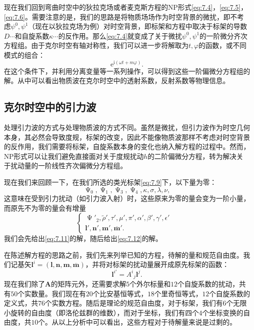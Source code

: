 现在我们回到弯曲时空中的狄拉克场或者麦克斯方程的NP形式\ref{eq:7.4}，\ref{eq:7.5}，\ref{eq:7.6}。需要注意的是，我们的思路是将物质场场作为时空背景的微扰，即不考虑$\psi ^{0} ,\psi ^{1}$（现在以狄拉克场为例）对时空背景，即标架和方程中取决于标架的导数$D\cdots $和自旋系数$\kappa \cdots $的反作用。那么\ref{eq:7.4}就变成了关于微扰$\psi ^{0} ,\psi ^{1}$的一阶微分齐次方程组。由于克尔时空有轴对称性，我们可以进一步将解取为$t,\varphi $的函数，或不同模式的组合\parencite{chandrasekhar1998mathematical}：
\begin{equation}
	\mathrm{e}^{\mathrm{i} (\omega t+m\varphi )} .
	\label{eq:7.10}
\end{equation}
在这个条件下，并利用分离变量等一系列操作，可以得到这些一阶偏微分方程组的解。从中可以看出物质波在克尔时空中的透射系数，反射系数等物理信息\parencite{chandrasekhar1998mathematical}。


\subsection{克尔时空中的引力波}

处理引力波的方式与处理物质波的方式不同。虽然是微扰，但引力波作为时空几何本身，其必然会导致度规，标架的改变，因此不能像物质波那样不考虑对时空背景的反作用，我们需要将标架，自旋系数本身的变化也纳入解方程的过程中。然而，NP形式可以让我们避免直接面对关于度规扰动$h$的二阶偏微分方程，转为解决关于扰动量的一阶线性齐次偏微分方程组。



现在我们来回顾一下，在我们所选的类光标架\ref{eq:7.9}下，以下量为零：
\begin{equation}
	\upPsi _{0} ,\upPsi _{1} ,\upPsi _{3} ,\upPsi _{4} ,\kappa ,\sigma ,\lambda ,\nu ,
	\label{eq:7.11}
\end{equation}
这意味在受到引力扰动（如引力波入射）时，这些原来为零的量会变为一阶小量，而原先不为零的量会有增量
\begin{equation}
	\begin{cases}
		\upPsi '_{2} ,\tilde{\rho } ',\tau ',\mu ',\pi ',\alpha ',\beta ',\gamma ',\epsilon ' & \\
		\boldsymbol{l} ',\boldsymbol{n} ',\boldsymbol{m} ',\overline{\boldsymbol{m}} '. & 
	\end{cases}
	\label{eq:7.12}
\end{equation}
我们会先给出\ref{eq:7.11}的解，随后给出\ref{eq:7.12}的解。



在陈述解方程的思路之前，我们先来列举已知的方程，待解的量和规范自由度。我们记基矢$\boldsymbol{l}^{i} =(\boldsymbol{l} ,\boldsymbol{n} ,\boldsymbol{m} ,\overline{\boldsymbol{m}} )$，并将对标架的扰动量展开成原先标架的函数：
\begin{equation*}
	\boldsymbol{l}^{i'} =A^{i}{}_{j}\boldsymbol{l}^{j} .
\end{equation*}
现在我们除了$\boldsymbol{A}$的矩阵元外，还需要求解$5$个外尔标量和$12$个自旋系数的扰动，共有$50$个实数量。我们现在有$20$个比安基恒等式，$18$个里奇恒等式，$12$个自旋系数的定义式，共$76$个实数方程。随后是理论的规范自由度，对于标架，我们有$6$个无限小旋转的自由度（即洛伦兹群的维数），而对于坐标，我们有四个$4$个坐标变换的自由度，共$10$个。从以上分析中可以看出，这些方程对于待解量来说是过剩的。



